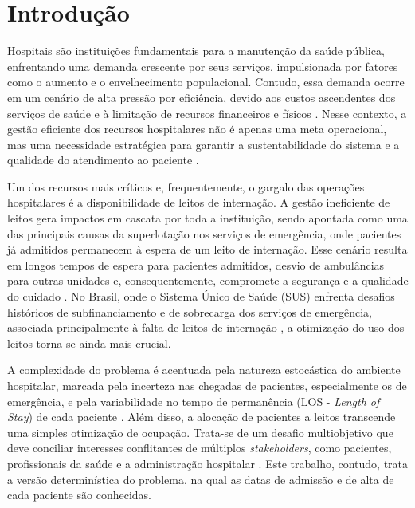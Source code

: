\chapter{Introdução}
\label{cap:introducao}

Hospitais são instituições fundamentais para a manutenção da saúde pública, enfrentando uma demanda crescente por seus serviços, impulsionada por fatores como o aumento e o envelhecimento populacional. Contudo, essa demanda ocorre em um cenário de alta pressão por eficiência, devido aos custos ascendentes dos serviços de saúde e à limitação de recursos financeiros e físicos \cite{brandeau2004operations, schafer2023combining}. Nesse contexto, a gestão eficiente dos recursos hospitalares não é apenas uma meta operacional, mas uma necessidade estratégica para garantir a sustentabilidade do sistema e a qualidade do atendimento ao paciente \cite{brandeau2004operations, he2019systematic}.

Um dos recursos mais críticos e, frequentemente, o gargalo das operações hospitalares é a disponibilidade de leitos de internação. A gestão ineficiente de leitos gera impactos em cascata por toda a instituição, sendo apontada como uma das principais causas da superlotação nos serviços de emergência, onde pacientes já admitidos permanecem à espera de um leito de internação. Esse cenário resulta em longos tempos de espera para pacientes admitidos, desvio de ambulâncias para outras unidades e, consequentemente, compromete a segurança e a qualidade do cuidado \cite{brandeau2004operations, he2019systematic}. No Brasil, onde o Sistema Único de Saúde (SUS) enfrenta desafios históricos de subfinanciamento \cite{paim2011brazilian} e de sobrecarga dos serviços de emergência, associada principalmente à falta de leitos de internação \cite{bittencourt2009intervencoes}, a otimização do uso dos leitos torna-se ainda mais crucial.

A complexidade do problema é acentuada pela natureza estocástica do ambiente hospitalar, marcada pela incerteza nas chegadas de pacientes, especialmente os de emergência, e pela variabilidade no tempo de permanência (LOS - \textit{Length of Stay}) de cada paciente \cite{ceschia2012modeling, he2019systematic, schafer2023combining}. Além disso, a alocação de pacientes a leitos transcende uma simples otimização de ocupação. Trata-se de um desafio multiobjetivo que deve conciliar interesses conflitantes de múltiplos \textit{stakeholders}, como pacientes, profissionais da saúde e a administração hospitalar \cite{schafer2023combining}. Este trabalho, contudo, trata a versão determinística do problema, na qual as datas de admissão e de alta de cada paciente são conhecidas.

